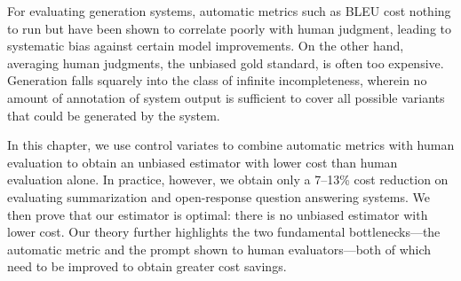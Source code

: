 

For evaluating generation systems, automatic metrics such as BLEU cost nothing to run but have been shown to correlate poorly with human judgment, leading to systematic bias against certain model improvements.
On the other hand, averaging human judgments, the unbiased gold standard, is often too expensive.
Generation falls squarely into the class of infinite incompleteness, wherein no amount of annotation of system output is sufficient to cover all possible variants that could be generated by the system.

In this chapter, we use control variates to combine automatic metrics with human evaluation to
obtain an unbiased estimator with lower cost than human evaluation alone.
In practice, however, we obtain only a 7--13\% cost reduction on evaluating summarization and open-response question answering systems.
We then prove that our estimator is optimal: there is no unbiased estimator with lower cost.
Our theory further highlights the two fundamental bottlenecks---the automatic
metric and the prompt shown to human evaluators---both of which need to be improved to obtain greater cost savings.
